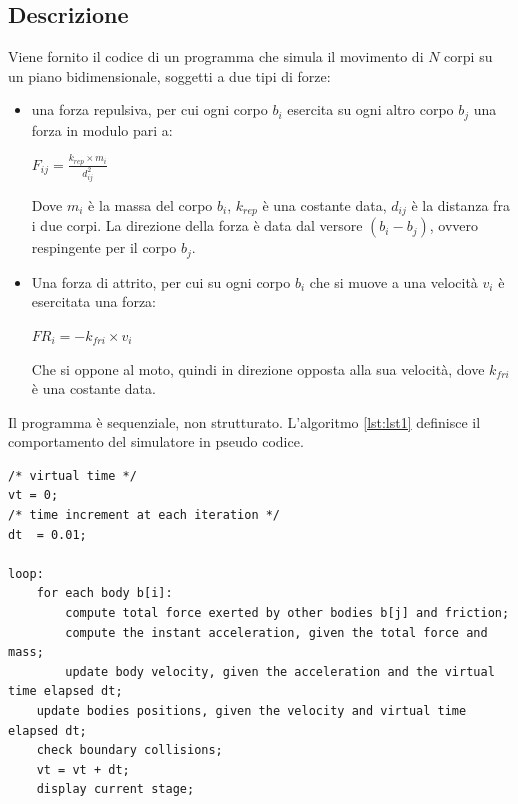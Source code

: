 \documentclass[12pt,a4paper,openright,twoside]{book}
\begin{document}
	
\frontmatter



\tableofcontents   

\mainmatter

\chapter{\introductionname}
\label{chap:introduction}
\section{Descrizione}
Viene fornito il codice di un programma che simula il movimento di $N$ corpi su un piano bidimensionale,
soggetti a due tipi di forze:
\begin{itemize}
	\item una forza repulsiva, per cui ogni corpo $b_{i}$ esercita su ogni altro corpo $b_{j}$ una forza in modulo pari a:
	\begin{center}
		$ F_{ij} = \frac{k_{rep} \times m_{i}}{d^2_{ij}} $
	\end{center}
	Dove $m_{i}$ è la massa del corpo $b_{i}$, $k_{rep}$ è una costante data, $d_{ij}$ è la distanza fra i due corpi.
	La direzione della forza è data dal versore $(b_{i} - b_{j})$, ovvero respingente per il corpo $b_{j}$.
	\item Una forza di attrito, per cui su ogni corpo $b_{i}$ che si muove a una velocità $v_{i}$ è esercitata una forza:
	\begin{center}
		$ FR_{i} = - k_{fri} \times v_{i} $
	\end{center}
	Che si oppone al moto, quindi in direzione opposta alla sua velocità, dove $k_{fri}$ è una costante data.
\end{itemize}
Il programma è sequenziale, non strutturato. 
L'algoritmo \ref{lst:lst1} definisce il comportamento del simulatore in pseudo codice.
\newpage
\begin{lstlisting}[label=lst:lst1,caption=pseudocodice del programma sequenziale]
/* virtual time */
vt = 0;
/* time increment at each iteration */     
dt  = 0.01;

loop:
	for each body b[i]:
		compute total force exerted by other bodies b[j] and friction;
		compute the instant acceleration, given the total force and mass;
		update body velocity, given the acceleration and the virtual time elapsed dt;
	update bodies positions, given the velocity and virtual time elapsed dt;
	check boundary collisions;
	vt = vt + dt;   
	display current stage;

\end{lstlisting}
\end{document}
